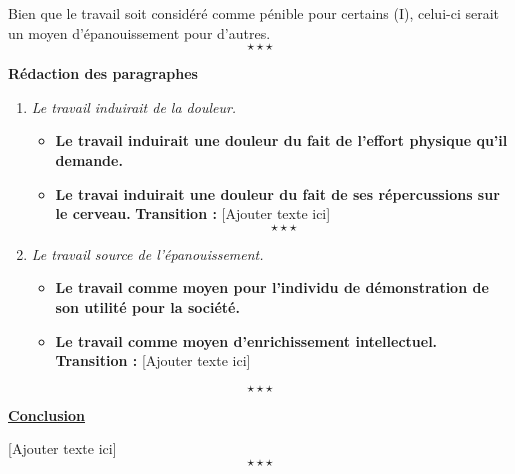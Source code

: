Bien que le travail soit considéré comme pénible pour certains (I), celui-ci serait un moyen d'épanouissement pour d'autres. $$\star \star \star$$
\begin{center}
	{\bfseries Rédaction des paragraphes}	
\end{center}
\begin{enumerate}[label*=$\longrightarrow$]
	\item \textit{Le travail induirait de la douleur.}
	\begin{itemize}
		\item \textbf{Le travail induirait une douleur du fait de l'effort physique qu'il demande.}
		\item \textbf{Le travai induirait une douleur du fait de ses répercussions sur le cerveau.} \newline \textbf{Transition :} [Ajouter texte ici] $$\star \star \star$$
	\end{itemize}
	\item \textit{Le travail source de l'épanouissement.}
	\begin{itemize}
		\item \textbf{Le travail comme moyen pour l'individu de démonstration de son utilité pour la société.}
		\item \textbf{Le travail comme moyen d'enrichissement intellectuel.} \newline \textbf{Transition :} [Ajouter texte ici]
	\end{itemize}
\end{enumerate}
$$\star \star \star$$
\begin{center}
	\textbf{\underline{Conclusion}} 
\end{center} 

[Ajouter texte ici] $$\star \star \star$$